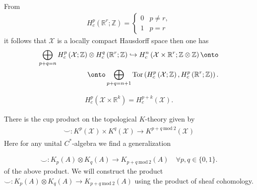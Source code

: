 \documentclass{beamer}
\theoremstyle{plain}
\newcommand{\Z}{\mathbb{Z}}
\newcommand{\be}{\begin{equation}}
\newcommand{\ee}{\end{equation}}
\newcommand{\bean}{\begin{eqnarray*}}
\newcommand{\eean}{\end{eqnarray*}}
\newcommand{\R}{\mathbb{R}}
\newcommand{\sX}{\mathcal{X}}       %
\newcommand{\hookto}{\hookrightarrow}        %
\begin{document}
\begin{frame}
	From 
	\be\label{kunnet_sheafrr_eqn}
	\begin{split}
		H^p_c\left(\R^r; \Z \right)= \begin{cases}
			0 & p \neq r,\\
			1 & p = r
		\end{cases}
	\end{split}
	\ee
	it follows that $\sX$ is a locally compact Hausdorff space then one has
	\bean\label{kunnet_sheafr_eqn}
	\begin{split}
		\bigoplus_{p+q = n} H^p_c\left(\sX ; \Z \right) \otimes H^q_c\left(\R^r; \Z \right)\hookto H^{n}_c\left(\sX \times \R^{r}; \Z \otimes \Z \right)\onto\\ \onto  \bigoplus_{p+q = n+1} \mathrm{Tor}\left( H^p_c\left(\sX ; \Z \right),  H^p_c\left(\R^r; \Z \right) \right). 
	\end{split}
	\eean
	
	\bean\label{shift_hom_eqn}
	H^p_c\left( \sX \times \R^k\right) = H^{p + k}_c\left( \sX\right).
	\eean
\end{frame}
\begin{frame}
	There is  the cup  product on the topological $K$-theory given by 
	\bean\label{k_top_p_eqn}
	\begin{split}
		\smile : K^p\left( \sX \right)\times  K^q\left( \sX \right) \to K^{p+q~ \mathrm{mod}~2}\left( \sX \right)
	\end{split}
	\eean
	Here for any unital $C^*$-algebra we find a generalization 
	
	\bean\label{cup_prodcc_eqn}
	\smile : K_p\left(A \right) \otimes K_q\left(A \right) \to K_{p+q~ \mathrm{mod}~2}\left(A \right) \quad \forall p, q \in \{0, 1\}.
	\eean
	of the above product. We will construct the product $\smile : K_p\left(A \right) \otimes K_q\left(A \right) \to K_{p+q~ \mathrm{mod}~2}\left(A \right)$ using the product of sheaf cohomology.
\end{frame}
\end{document}
